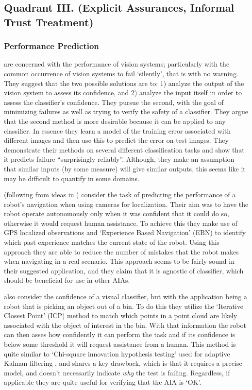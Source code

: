 \subsection{Quadrant III. (Explicit Assurances, Informal Trust Treatment)}\label{sec:q3}
\subsubsection{Performance Prediction}
    \citet{Zhang2014-he} are concerned with the performance of vision systems; particularly with the common occurrence of vision systems to fail `silently', that is with no warning. They suggest that the two possible solutions are to: 1) analyze the output of the vision system to assess its confidence, and 2) analyze the input itself in order to assess the classifier's confidence. They pursue the second, with the goal of minimizing failures as well as trying to verify the safety of a classifier. They argue that the second method is more desirable because it can be applied to any classifier. In essence they learn a model of the training error associated with different images and then use this to predict the error on test images. They demonstrate their methods on several different classification tasks and show that it predicts failure ``surprisingly reliably''. Although, they make an assumption that similar inputs (by some measure) will give similar outputs, this seems like it may be difficult to quantify in some domains.

    \citet{Gurau2016-hs} (following from ideas in \citet{Churchill2015-ei}) consider the task of predicting the performance of a robot's navigation when using cameras for localization. Their aim was to have the robot operate autonomously only when it was confident that it could do so, otherwise it would request human assistance. To achieve this they make use of GPS localized observations and `Experience Based Navigation' (EBN) to identify which past experience matches the current state of the robot. Using this approach they are able to reduce the number of mistakes that the robot makes when navigating in a real scenario. This approach seems to be fairly sound in their suggested application, and they claim that it is agnostic of classifier, which should be beneficial for use in other AIAs.

    \citet{Kaipa2015-hy} also consider the confidence of a visual classifier, but with the application being a robot that is picking an object out of a bin. To do this they utilize the `Iterative Closest Point' (ICP) method to match which points in a point cloud are likely associated with the object of interest in the bin. With that information the robot can then asses how confidently it can perform the task and if its confidence is below some threshold it will request assistance from a human. This method is quite similar to `Chi-square innovation hypothesis testing' used for adaptive Kalman filtering \cite{Bar-Shalom2001-tg}, and shares a key drawback, which is that it requires a precise model, and doesn't necessarily indicate \emph{why} the test is failing. Regardless, if applicable they are quite useful for verifying that the AIA is `OK'.

